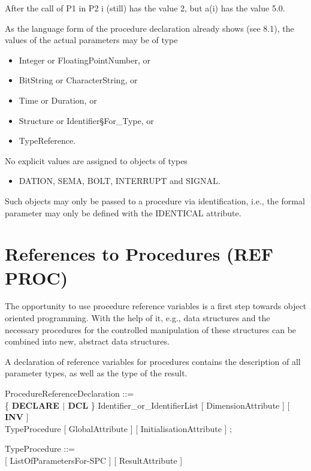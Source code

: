 After the call of P1 in P2 i (still) has the value 2, but a(i) has the
value 5.0.

As the language form of the procedure declaration already shows (see
8.1), the values of the actual parameters may be of type
\begin{itemize}
\item Integer or FloatingPointNumber, or
\item BitString or CharacterString, or
\item Time or Duration, or
\item Structure or Identifier\S For\_Type, or
\item TypeReference.
\end{itemize}
No explicit values are assigned to objects of types
\begin{itemize}
\item DATION, SEMA, BOLT, INTERRUPT and SIGNAL.
\end{itemize}
Such objects may only be passed to a procedure via identification, i.e.,
the formal parameter may only be defined with the IDENTICAL attribute.

\section{References to Procedures (REF PROC)}  %

The opportunity to use procedure reference variables is a first step
towards object oriented programming. With the help of it, e.g., data
structures and the necessary procedures for the controlled manipulation of
these structures can be combined into new, abstract data structures.

A declaration of reference variables for procedures contains the
description of all parameter types, as well as the type of the result.

\begin{front}
ProcedureReferenceDeclaration ::= \\
\x \{ {\bf DECLARE $\mid$ DCL} \} Identifier\_or\_IdentifierList [ DimensionAttribute ] [ {\bf INV} ]\\
 TypeProcedure [ GlobalAttribute ] [ InitialisationAttribute ] ;

TypeProcedure ::=\\
 [ ListOfParametersFor-SPC ] [ ResultAttribute ]
\end{front}
\begin{grammar}
 
\end{grammar}

